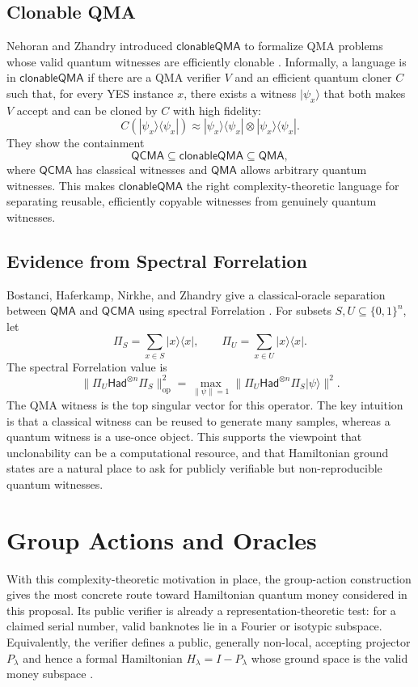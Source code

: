 \documentclass[12pt]{article}
\begin{document}
\subsection{Clonable QMA}
Nehoran and Zhandry introduced $\mathsf{clonableQMA}$ to formalize QMA problems whose valid quantum witnesses are efficiently clonable \cite{nehoranComputationalSeparationQuantum2024}. Informally, a language is in $\mathsf{clonableQMA}$ if there are a QMA verifier $V$ and an efficient quantum cloner $C$ such that, for every YES instance $x$, there exists a witness $|\psi_x\rangle$ that both makes $V$ accept and can be cloned by $C$ with high fidelity:
\[
C(|\psi_x\rangle\langle\psi_x|)\approx |\psi_x\rangle\langle\psi_x|\otimes |\psi_x\rangle\langle\psi_x|.
\]
They show the containment
\[
\mathsf{QCMA}\subseteq \mathsf{clonableQMA}\subseteq \mathsf{QMA},
\]
where $\mathsf{QCMA}$ has classical witnesses and $\mathsf{QMA}$ allows arbitrary quantum witnesses. This makes $\mathsf{clonableQMA}$ the right complexity-theoretic language for separating reusable, efficiently copyable witnesses from genuinely quantum witnesses.

\subsection{Evidence from Spectral Forrelation}
Bostanci, Haferkamp, Nirkhe, and Zhandry give a classical-oracle separation between $\mathsf{QMA}$ and $\mathsf{QCMA}$ using spectral Forrelation \cite{bostanciSeparatingQMAQCMA2025}. For subsets $S,U\subseteq \{0,1\}^n$, let
\[
\Pi_S=\sum_{x\in S}|x\rangle\langle x|,
\qquad
\Pi_U=\sum_{x\in U}|x\rangle\langle x|.
\]
The spectral Forrelation value is
\[
\|\Pi_U \mathsf{Had}^{\otimes n}\Pi_S\|_{\mathrm{op}}^2
=
\max_{\|\psi\|=1}\|\Pi_U \mathsf{Had}^{\otimes n}\Pi_S|\psi\rangle\|^2.
\]
The QMA witness is the top singular vector for this operator. The key intuition is that a classical witness can be reused to generate many samples, whereas a quantum witness is a use-once object. This supports the viewpoint that unclonability can be a computational resource, and that Hamiltonian ground states are a natural place to ask for publicly verifiable but non-reproducible quantum witnesses.

\section{Group Actions and Oracles}

With this complexity-theoretic motivation in place, the group-action construction gives the most concrete route toward Hamiltonian quantum money considered in this proposal.
Its public verifier is already a representation-theoretic test: for a claimed serial number, valid banknotes lie in a Fourier or isotypic subspace.
Equivalently, the verifier defines a public, generally non-local, accepting projector $P_\lambda$ and hence a formal Hamiltonian $H_\lambda=I-P_\lambda$ whose ground space is the valid money subspace \cite{zhandryQuantumMoneyAbelian2025,bostanciGeneralQuantumDuality2025}.
\end{document}
